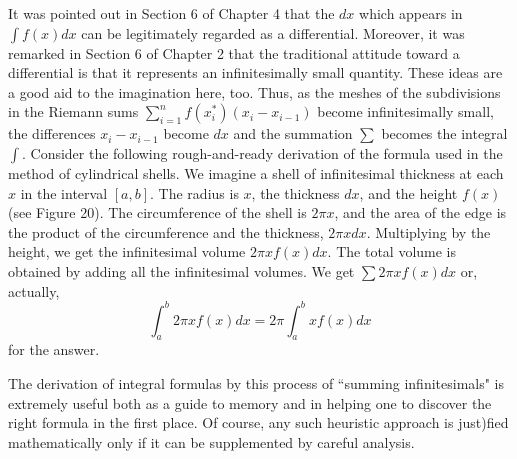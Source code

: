 It was pointed out in Section 6 of Chapter 4 that the $dx$ which appears in $\int f(x) dx$ can be legitimately regarded as a differential. Moreover, it was remarked in Section 6 of Chapter 2 that the traditional attitude toward a differential is that it represents an infinitesimally small quantity. These ideas are a good aid to the imagination here, too. Thus, as the meshes of the subdivisions in the Riemann sums $\sum_{i=1}^n f(x_i^*)(x_i-x_{i-1})$ become infinitesimally small, the differences $x_i - x_{i-1}$ become $dx$ and the summation
$\sum$ becomes the integral $\int$. Consider the following rough-and-ready derivation of the formula used in the method of cylindrical shells. We imagine a shell of infinitesimal thickness at each $x$ in the interval $[a, b]$. The radius is $x$, the thickness $dx$, and the height $f(x)$ (see Figure 20). The circumference of the shell is $2\pi x$, and the area of the edge is the product of the circumference and the thickness, $2\pi xdx$. Multiplying by the height, we get the infinitesimal volume $2\pi xf(x)dx$. The total volume is obtained by adding all the infinitesimal volumes. We get $\sum 2 \pi x f(x) dx$ or, actually,
$$
 \int_a^b 2\pi x f (x) dx = 2\pi \int_a^b xf (x) dx
$$
for the answer.

The derivation of integral formulas by this process of ``summing infinitesimals" is extremely useful both as a guide to memory and in helping one to discover the right formula in the first place. Of course, any such heuristic approach is just)fied mathematically only if it can be supplemented by careful analysis.
 
 
